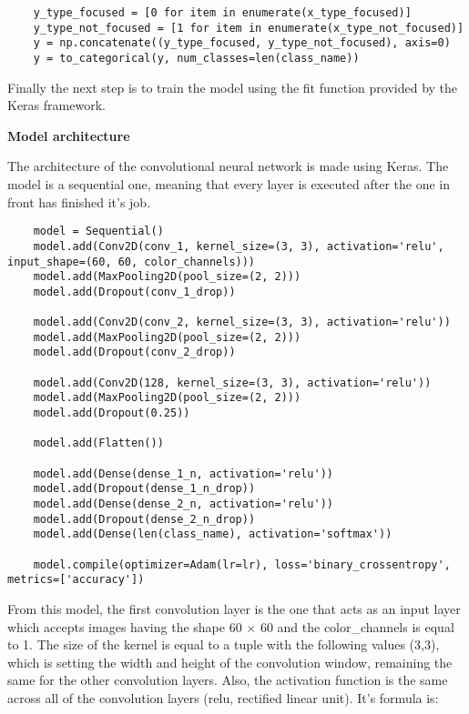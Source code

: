 \begin{lstlisting}
    y_type_focused = [0 for item in enumerate(x_type_focused)]
    y_type_not_focused = [1 for item in enumerate(x_type_not_focused)]
    y = np.concatenate((y_type_focused, y_type_not_focused), axis=0)
    y = to_categorical(y, num_classes=len(class_name))
\end{lstlisting}

Finally the next step is to train the model using the fit function provided by the Keras framework.

\vspace{2ex}
\textbf{Model architecture} \par
\vspace{2ex}

The architecture of the convolutional neural network is made using Keras. The model is a sequential one, meaning that every layer is executed after the one in front has finished it's job. 

\begin{lstlisting}
    model = Sequential()
    model.add(Conv2D(conv_1, kernel_size=(3, 3), activation='relu', input_shape=(60, 60, color_channels)))
    model.add(MaxPooling2D(pool_size=(2, 2)))
    model.add(Dropout(conv_1_drop))
    
    model.add(Conv2D(conv_2, kernel_size=(3, 3), activation='relu'))
    model.add(MaxPooling2D(pool_size=(2, 2)))
    model.add(Dropout(conv_2_drop))
    
    model.add(Conv2D(128, kernel_size=(3, 3), activation='relu'))
    model.add(MaxPooling2D(pool_size=(2, 2)))
    model.add(Dropout(0.25))
    
    model.add(Flatten())
    
    model.add(Dense(dense_1_n, activation='relu'))
    model.add(Dropout(dense_1_n_drop))
    model.add(Dense(dense_2_n, activation='relu'))
    model.add(Dropout(dense_2_n_drop))
    model.add(Dense(len(class_name), activation='softmax'))
    
    model.compile(optimizer=Adam(lr=lr), loss='binary_crossentropy', metrics=['accuracy'])
\end{lstlisting}

From this model, the first convolution layer is the one that acts as an input layer which accepts images having the shape 60 $\times$ 60 and the color\_channels is equal to 1. The size of the kernel is equal to a tuple with the following values (3,3), which is setting the width and height of the convolution window, remaining the same for the other convolution layers. Also, the activation function is the same across all of the convolution layers (relu, rectified linear unit). It's formula is:

